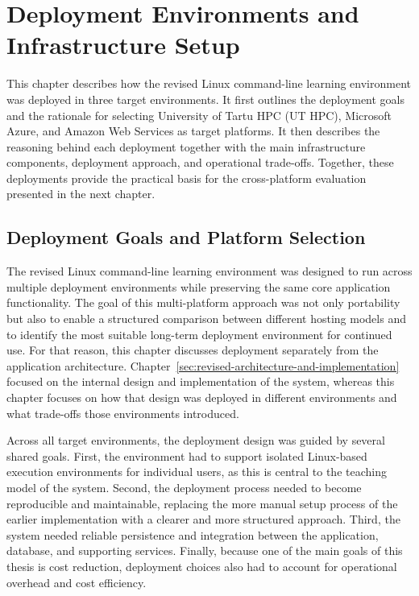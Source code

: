 

\section{Deployment Environments and Infrastructure Setup} \label{sec:deployment-environments-and-infrastructure-setup}
This chapter describes how the revised Linux command-line learning environment was deployed in three target environments.
It first outlines the deployment goals and the rationale for selecting University of Tartu HPC (UT HPC), Microsoft Azure, and Amazon Web Services as target platforms.
It then describes the reasoning behind each deployment together with the main infrastructure components, deployment approach, and operational trade-offs.
Together, these deployments provide the practical basis for the cross-platform evaluation presented in the next chapter.

\subsection{Deployment Goals and Platform Selection} \label{subsec:deployment-goals-and-platform-selection}
The revised Linux command-line learning environment was designed to run across multiple deployment environments while preserving the same core application functionality.
The goal of this multi-platform approach was not only portability but also to enable a structured comparison between different hosting models and to identify the most suitable long-term deployment environment for continued use.
For that reason, this chapter discusses deployment separately from the application architecture.
Chapter~\ref{sec:revised-architecture-and-implementation} focused on the internal design and implementation of the system, whereas this chapter focuses on how that design was deployed in different environments and what trade-offs those environments introduced.

Across all target environments, the deployment design was guided by several shared goals.
First, the environment had to support isolated Linux-based execution environments for individual users, as this is central to the teaching model of the system.
Second, the deployment process needed to become reproducible and maintainable, replacing the more manual setup process of the earlier implementation with a clearer and more structured approach.
Third, the system needed reliable persistence and integration between the application, database, and supporting services.
Finally, because one of the main goals of this thesis is cost reduction, deployment choices also had to account for operational overhead and cost efficiency.

